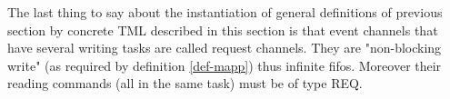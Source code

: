 \documentclass{article}
\begin{document}
The last thing to say about the instantiation of general definitions of previous section by concrete TML described in this section is that event channels that have several writing tasks are called request channels. They are "non-blocking write" (as required by definition \ref{def-mapp}) thus infinite fifos. Moreover their reading commands (all in the same task) must be of type REQ.
\end{document}
